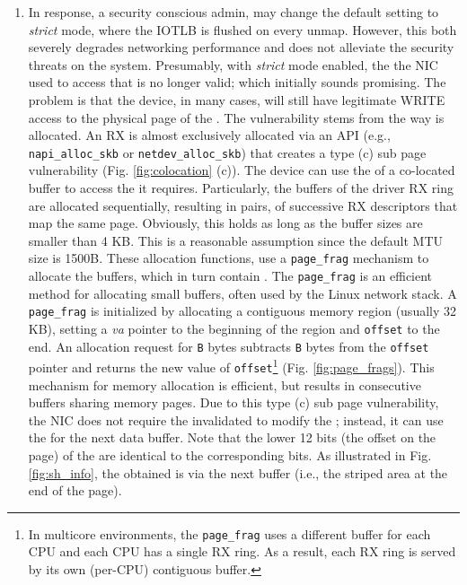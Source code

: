 \begin{enumerate}[label=(\alph*)]
\item In response, a security conscious admin, may change the default setting to \emph{strict} mode, where the IOTLB is flushed on every unmap. However, this both severely degrades networking performance \cite{MMT16,MSMT18} and does not alleviate the security threats on the system. Presumably, with \emph{strict} mode enabled, the \iova{} the NIC used to access that \shinfo{} is no longer valid; which initially sounds promising. The problem is that the device, in many cases, will still have legitimate WRITE access to the physical page of the \shinfo. The vulnerability stems from the way \data{} is allocated. An RX \skb{} is almost exclusively allocated via an API (e.g., \texttt{napi\_alloc\_skb} or \texttt{netdev\_alloc\_skb}) that creates a type (c) sub page vulnerability (Fig. \ref{fig:colocation} (c)). The device can use the \iova{} of a co-located buffer to access the \shinfo{} it requires. Particularly, the buffers of the driver RX ring are allocated sequentially, resulting in pairs, of successive RX descriptors that map the same page. Obviously, this holds as long as the buffer sizes are smaller than 4 KB. This is a reasonable assumption since the default MTU size is 1500B. These allocation functions, use a \texttt{page\_frag} mechanism to allocate the \data{} buffers, which in turn contain \shinfo. The \texttt{page\_frag} is an efficient method for allocating small buffers, often used by the Linux network stack. A \texttt{page\_frag} is initialized by allocating a contiguous memory region (usually 32 KB), setting a \textit{va} pointer to the beginning of the region and \texttt{offset} to the end. An allocation request for \texttt{B} bytes subtracts \texttt{B} bytes from the \texttt{offset} pointer and returns the new value of \texttt{offset}\footnote{In multicore environments, the \texttt{page\_frag} uses a different buffer for each CPU and each CPU has a single RX ring. As a result, each RX ring is served by its own (per-CPU) contiguous buffer.} (Fig. \ref{fig:page_frags}). This mechanism for memory allocation is efficient, but results in consecutive \data{} buffers sharing memory pages. Due to this type (c) sub page vulnerability, the NIC does not require the invalidated \iova{} to modify the \shinfo; instead, it can use the \iova{} for the next data buffer. Note that the lower 12 bits (the offset on the page) of the \iova{} are identical to the corresponding \kva{} bits. As illustrated in Fig. \ref{fig:sh_info}, the \oportunity{} obtained is via the next buffer (i.e., the striped area at the end of the page).
\end{enumerate}

